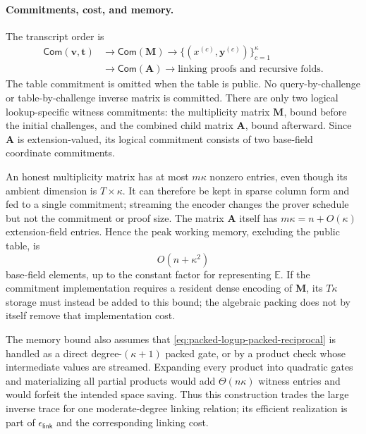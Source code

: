 \documentclass[runningheads]{llncs}
\begin{document}
\paragraph{Commitments, cost, and memory.}
The transcript order is
\begin{equation}
\begin{aligned}
  \mathsf{Com}(\bm v,\bm t)
    &\longrightarrow \mathsf{Com}(\bm M)
    \longrightarrow
      \{(x^{(c)},\bm y^{(c)})\}_{c=1}^{\kappa}\\
    &\longrightarrow \mathsf{Com}(\bm A)
    \longrightarrow
      \text{linking proofs and recursive folds}.
\end{aligned}
\label{eq:packed-logup-transcript-order}
\end{equation}
The table commitment is omitted when the table is public.  No
query-by-challenge or table-by-challenge inverse matrix is committed.
There are only two logical lookup-specific witness commitments: the
multiplicity matrix \(\bm M\), bound before the initial challenges, and
the combined child matrix \(\bm A\), bound afterward.  Since
\(\bm A\) is extension-valued, its logical commitment consists of two
base-field coordinate commitments.

An honest multiplicity matrix has at most \(m\kappa\) nonzero entries,
even though its ambient dimension is \(T\times\kappa\).  It can
therefore be kept in sparse column form and fed to a single commitment;
streaming the encoder changes the prover schedule but not the
commitment or proof size.  The matrix \(\bm A\) itself has
\(m\kappa=n+O(\kappa)\) extension-field entries.  Hence the peak
working memory, excluding the public table, is
\begin{equation}
    \boxed{O(n+\kappa^2)}
\label{eq:packed-logup-working-memory}
\end{equation}
base-field elements, up to the constant factor for representing
\(\mathbb E\).  If the commitment implementation requires a resident
dense encoding of \(\bm M\), its \(T\kappa\) storage must instead be
added to this bound; the algebraic packing does not by itself remove
that implementation cost.

The memory bound also assumes that
\eqref{eq:packed-logup-packed-reciprocal} is handled as a direct
degree-\((\kappa+1)\) packed gate, or by a product check whose
intermediate values are streamed.  Expanding every product into
quadratic gates and materializing all partial products would add
\(\Theta(n\kappa)\) witness entries and would forfeit the intended
space saving.  Thus this construction trades the large inverse trace
for one moderate-degree linking relation; its efficient realization is
part of \(\epsilon_{\mathsf{link}}\) and the corresponding linking cost.
\end{document}
